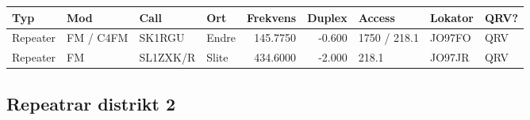 \scriptsize

\begin{longtable}{llllrrlll}
\bf Typ  & \bf Mod     & \bf Call & \bf Ort     & \bf Frekvens & \bf Duplex & \bf Access & \bf Lokator & \bf QRV? \\ \hline
Repeater   & FM / C4FM & SK1RGU   & Endre        & 145.7750     & -0.600     & 1750 / 218.1 & JO97FO      & QRV      \\
Repeater   & FM        & SL1ZXK/R & Slite        & 434.6000     & -2.000     & 218.1        & JO97JR      & QRV      \\
\end{longtable}

\normalsize

\subsection{Repeatrar distrikt 2}

\scriptsize

